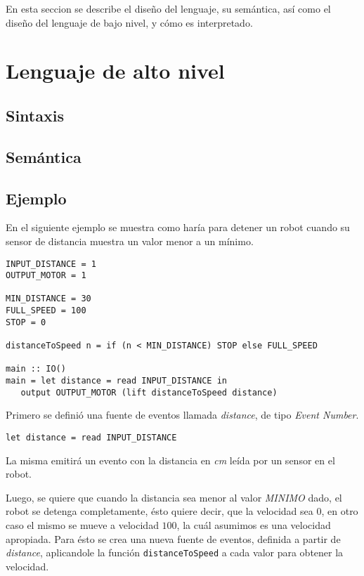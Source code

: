 En esta seccion se describe el diseño del lenguaje, su semántica,
así como el diseño del lenguaje de bajo nivel, y cómo es interpretado.

\section{Lenguaje de alto nivel}

\subsection{Sintaxis}



\subsection{Semántica}


\subsection{Ejemplo}

En el siguiente ejemplo se muestra como haría para detener un
robot cuando su sensor de distancia muestra un valor menor a un mínimo.

\begin{verbatim}
INPUT_DISTANCE = 1
OUTPUT_MOTOR = 1

MIN_DISTANCE = 30
FULL_SPEED = 100
STOP = 0

distanceToSpeed n = if (n < MIN_DISTANCE) STOP else FULL_SPEED

main :: IO()
main = let distance = read INPUT_DISTANCE in
   output OUTPUT_MOTOR (lift distanceToSpeed distance)

\end{verbatim}

Primero se definió una fuente de eventos llamada \emph{distance},
de tipo \emph{Event Number}.

\begin{verbatim}
let distance = read INPUT_DISTANCE
\end{verbatim}

La misma emitirá un evento con la distancia en \emph{cm} leída
por un sensor en el robot.

  Luego, se quiere que cuando la distancia sea menor al valor
\emph{MINIMO} dado, el robot se detenga completamente, ésto
quiere decir, que la velocidad sea $0$, en otro caso el mismo
se mueve a velocidad $100$, la cuál asumimos es una velocidad
apropiada.
  Para ésto se crea una nueva fuente de eventos, definida a partir
de \emph{distance}, aplicandole la función \texttt{distanceToSpeed} 
a cada valor para obtener la velocidad.

